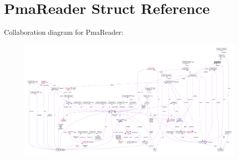 \hypertarget{structPmaReader}{}\section{Pma\+Reader Struct Reference}
\label{structPmaReader}


Collaboration diagram for Pma\+Reader\+:\nopagebreak
\begin{figure}[H]
\begin{center}
\leavevmode
\includegraphics[width=350pt]{structPmaReader__coll__graph}
\end{center}
\end{figure}
